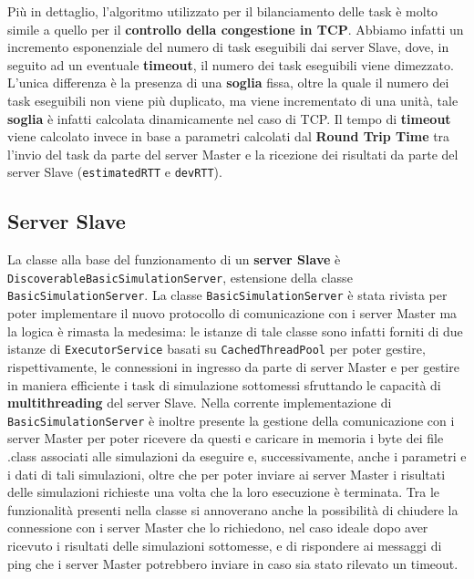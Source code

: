 Più in dettaglio, l'algoritmo utilizzato per il bilanciamento delle task è molto simile a quello per il \textbf{controllo della congestione in TCP}. Abbiamo infatti un incremento esponenziale del numero di task eseguibili dai server Slave, dove, in seguito ad un eventuale \textbf{timeout}, il numero dei task eseguibili viene dimezzato. L'unica differenza è la presenza di una \textbf{soglia} fissa, oltre la quale il numero dei task eseguibili non viene più duplicato, ma viene incrementato di una unità, tale \textbf{soglia} è infatti calcolata dinamicamente nel caso di TCP. Il tempo di \textbf{timeout} viene calcolato invece in base a parametri calcolati dal \textbf{Round Trip Time} tra l'invio del task da parte del server Master e la ricezione dei risultati da parte del server Slave (\texttt{estimatedRTT} e \texttt{devRTT}).

\subsection{Server Slave}
La classe alla base del funzionamento di un \textbf{server Slave} è \texttt{DiscoverableBasicSimulationServer}, estensione della classe \texttt{BasicSimulationServer}.
La classe \texttt{BasicSimulationServer} è stata rivista per poter implementare il nuovo protocollo di comunicazione con i server Master ma la logica è rimasta la medesima:
le istanze di tale classe sono infatti forniti di due istanze di \texttt{ExecutorService} basati su \texttt{CachedThreadPool} per poter gestire, rispettivamente, le connessioni in ingresso da parte di server Master
e per gestire in maniera efficiente i task di simulazione sottomessi sfruttando le capacità di \textbf{multithreading} del server Slave.
Nella corrente implementazione di \texttt{BasicSimulationServer} è inoltre presente la gestione della comunicazione con i server Master per poter ricevere da questi e caricare in memoria i byte dei file .class associati
alle simulazioni da eseguire e, successivamente, anche i parametri e i dati di tali simulazioni, oltre che per poter inviare ai server Master i risultati delle simulazioni richieste una volta che la loro esecuzione è terminata.
Tra le funzionalità presenti nella classe si annoverano anche la possibilità di chiudere la connessione con i server Master che lo richiedono, nel caso ideale dopo aver ricevuto i risultati delle simulazioni sottomesse,
e di rispondere ai messaggi di ping che i server Master potrebbero inviare in caso sia stato rilevato un timeout. 

